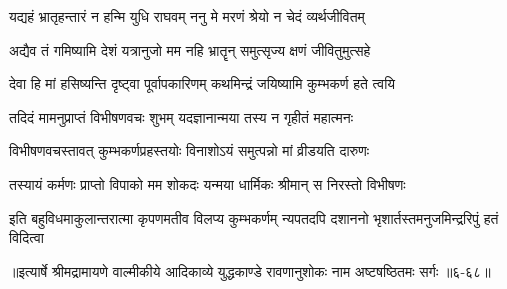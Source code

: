 \twolineshloka
{यद्यहं भ्रातृहन्तारं न हन्मि युधि राघवम्}
{ननु मे मरणं श्रेयो न चेदं व्यर्थजीवितम्} %

\twolineshloka
{अद्यैव तं गमिष्यामि देशं यत्रानुजो मम}
{नहि भ्रातॄन् समुत्सृज्य क्षणं जीवितुमुत्सहे} %

\twolineshloka
{देवा हि मां हसिष्यन्ति दृष्ट्वा पूर्वापकारिणम्}
{कथमिन्द्रं जयिष्यामि कुम्भकर्ण हते त्वयि} %

\twolineshloka
{तदिदं मामनुप्राप्तं विभीषणवचः शुभम्}
{यदज्ञानान्मया तस्य न गृहीतं महात्मनः} %

\twolineshloka
{विभीषणवचस्तावत् कुम्भकर्णप्रहस्तयोः}
{विनाशोऽयं समुत्पन्नो मां व्रीडयति दारुणः} %

\twolineshloka
{तस्यायं कर्मणः प्राप्तो विपाको मम शोकदः}
{यन्मया धार्मिकः श्रीमान् स निरस्तो विभीषणः} %

\twolineshloka
{इति बहुविधमाकुलान्तरात्मा कृपणमतीव विलप्य कुम्भकर्णम्}
{न्यपतदपि दशाननो भृशार्तस्तमनुजमिन्द्ररिपुं हतं विदित्वा} %


॥इत्यार्षे श्रीमद्रामायणे वाल्मीकीये आदिकाव्ये युद्धकाण्डे रावणानुशोकः नाम अष्टषष्ठितमः सर्गः ॥६-६८॥
